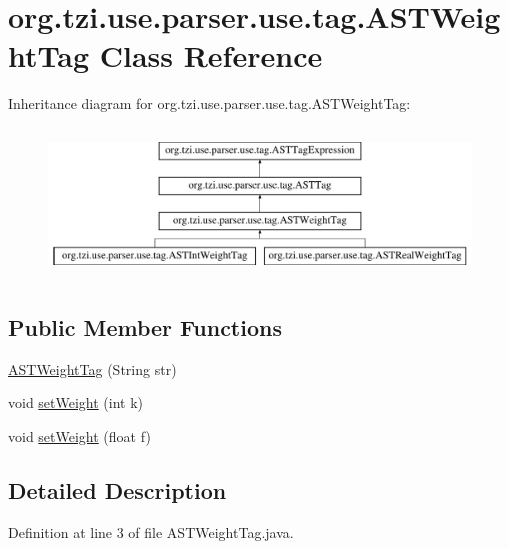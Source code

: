 \hypertarget{classorg_1_1tzi_1_1use_1_1parser_1_1use_1_1tag_1_1_a_s_t_weight_tag}{\section{org.\-tzi.\-use.\-parser.\-use.\-tag.\-A\-S\-T\-Weight\-Tag Class Reference}
\label{classorg_1_1tzi_1_1use_1_1parser_1_1use_1_1tag_1_1_a_s_t_weight_tag}
}
Inheritance diagram for org.\-tzi.\-use.\-parser.\-use.\-tag.\-A\-S\-T\-Weight\-Tag\-:\begin{figure}[H]
\begin{center}
\leavevmode
\includegraphics[height=4.000000cm]{classorg_1_1tzi_1_1use_1_1parser_1_1use_1_1tag_1_1_a_s_t_weight_tag}
\end{center}
\end{figure}
\subsection*{Public Member Functions}
\begin{DoxyCompactItemize}
\item 
\hyperlink{classorg_1_1tzi_1_1use_1_1parser_1_1use_1_1tag_1_1_a_s_t_weight_tag_acd1686d3aa1ca1da9276831b6ba8843c}{A\-S\-T\-Weight\-Tag} (String str)
\item 
void \hyperlink{classorg_1_1tzi_1_1use_1_1parser_1_1use_1_1tag_1_1_a_s_t_weight_tag_a1471e65694062d2469f1b77823804d58}{set\-Weight} (int k)
\item 
void \hyperlink{classorg_1_1tzi_1_1use_1_1parser_1_1use_1_1tag_1_1_a_s_t_weight_tag_ab17ea784d9921eb47fa65ebb92da208f}{set\-Weight} (float f)
\end{DoxyCompactItemize}


\subsection{Detailed Description}


Definition at line 3 of file A\-S\-T\-Weight\-Tag.\-java.



